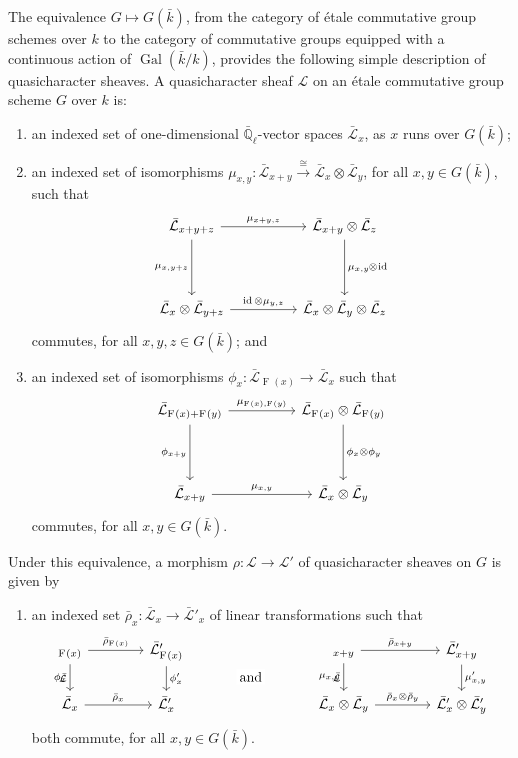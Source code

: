 \documentclass[10pt]{amsart}
\makeatletter
\theoremstyle{plain}
\theoremstyle{definition}
\theoremstyle{remark}
\newcommand{\EE}{\mathbb{\bar Q}_\ell}
\newcommand{\bFq}{\bar{k}}
\newcommand{\Fq}{k}
\DeclareMathOperator{\Gal}{Gal}
\newcommand{\Frob}[1]{\operatorname{F}_{#1}}
\DeclareMathOperator{\id}{id}
\newcommand{\iso}{{\ \cong\ }}
\newcommand{\qcs}[1]{{\mathcal{#1}}}
\newcommand{\gqcs}[1]{{\mathcal{\bar #1}}}
\newcommand{\labitem}[2]{
\def\@itemlabel{\textbf{#1}}
\item
\def\@currentlabel{#1}\label{#2}}
\newcommand{\brho}{{\bar\rho}}
\newcommand{\tight}[3]{\hspace{-#1pt}{#2}\hspace{-#3pt}}
\makeatother
\begin{document}
The equivalence $G \mapsto G(\bFq)$,
from the category of \'etale commutative group schemes over $\Fq$ to the category of commutative groups equipped
with a continuous action of $\Gal(\bFq/\Fq)$,
provides the following simple description of quasicharacter sheaves.
%
A quasicharacter sheaf $\qcs{L}$ on an \'etale commutative group scheme $G$ over $\Fq$ is:
\begin{enumerate}
 \labitem{(qc.1)}{qc.1} an indexed set of one-dimensional
  $\EE$-vector spaces $\gqcs{L}_x$, as $x$ runs over
  $G(\bFq)$;

 \labitem{(qc.2)}{qc.2} an indexed set of isomorphisms
  $\mu_{x,y} : \gqcs{L}_{x+y} \xrightarrow{\iso} \gqcs{L}_{x} \otimes\gqcs{L}_{y}$,
  for all $x,y \in G(\bFq)$, such that
  \[
   \begin{tikzcd}[row sep=40]
    \gqcs{L}_{x+y+z} \arrow{rr}{\mu_{x+y,z}} \arrow[swap]{d}{\mu_{x,y+z}}
    && \gqcs{L}_{x+y}\otimes\gqcs{L}_{z} \dar{\mu_{x,y} \tight{0.5}{\otimes}{1} \id} \\
    \gqcs{L}_{x} \otimes\gqcs{L}_{y+z} \arrow{rr}{\id \otimes\mu_{y,z}}
    && \gqcs{L}_{x} \otimes\gqcs{L}_{y} \otimes\gqcs{L}_{z}
   \end{tikzcd}
  \]
  commutes, for all $x,y,z\in G(\bFq)$; and
 \labitem{(qc.3)}{qc.3} an indexed set of isomorphisms $\phi_{x} : \gqcs{L}_{\Frob{}(x)} \to \gqcs{L}_x$
  such that
  \[
   \begin{tikzcd}[row sep=40]
    \gqcs{L}_{\Frob{}(x)+\Frob{}(y)} \arrow[swap]{d}{\phi_{x+y}} \arrow{rr}{\mu_{\Frob{}(x),\Frob{}(y)}}
    && \gqcs{L}_{\Frob{}(x)}\otimes\gqcs{L}_{\Frob{}(y)} \dar{\phi_x \tight{0}{\otimes}{0} \phi_y} \\
    \gqcs{L}_{x+y} \arrow{rr}{\mu_{x,y}}
    && \gqcs{L}_x \otimes\gqcs{L}_y
   \end{tikzcd}
  \]
  commutes, for all $x,y\in G(\bFq)$.
\end{enumerate}
Under this equivalence, a morphism $\rho : \qcs{L} \to \qcs{L'}$ of quasicharacter sheaves on $G$ is given by
\begin{enumerate}
 \labitem{(qc.4)}{qc.4} an indexed set $\brho_x : \gqcs{L}_x \to \gqcs{L'}_x$
  of linear transformations such that
  \[
   \begin{tikzcd}[column sep=40]
    \arrow[swap]{d}{\phi_x} \gqcs{L}_{\Frob{}(x)} \rar{\brho_{\Frob{}(x)}} & \gqcs{L'}_{\Frob{}(x)} \dar{\phi_x'}
    &\arrow[draw=none]{d}[pos=.4,description]{\text{\normalsize{and}}}
    & \arrow[swap]{d}{\mu_{x,y}} \gqcs{L}_{x+y} \rar{\brho_{x+y}} & \gqcs{L'}_{x+y} \dar{\mu'_{x,y}} \\
    \gqcs{L}_x \rar{\brho_x} & \gqcs{L'}_x
    & {} & \gqcs{L}_x\otimes\gqcs{L}_y \rar{\brho_x\otimes\brho_y} & \gqcs{L'}_x \otimes\gqcs{L'}_y
   \end{tikzcd}
  \]
  both commute, for all $x, y \in G(\bFq)$.
\end{enumerate}
\end{document}
